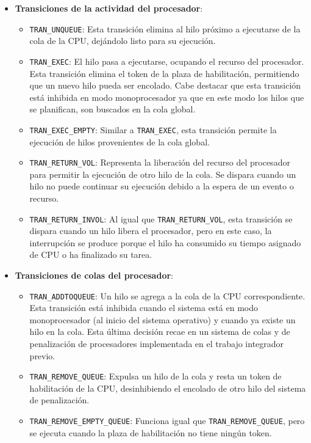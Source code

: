 \begin{itemize}
    \item \textbf{Transiciones de la actividad del procesador}:
        \begin{itemize}
            \item \verb|TRAN_UNQUEUE|: Esta transición elimina al hilo próximo a ejecutarse de la cola de la CPU, dejándolo listo para su ejecución.
            \item \verb|TRAN_EXEC|: El hilo pasa a ejecutarse, ocupando el recurso del procesador. Esta transición elimina el token de la plaza de habilitación, permitiendo que un nuevo hilo pueda ser encolado. Cabe destacar que esta transición está inhibida en modo monoprocesador ya que en este modo los hilos que se planifican, son buscados en la cola global.
            \item \verb|TRAN_EXEC_EMPTY|: Similar a \verb|TRAN_EXEC|, esta transición permite la ejecución de hilos provenientes de la cola global.
            \item \verb|TRAN_RETURN_VOL|: Representa la liberación del recurso del procesador para permitir la ejecución de otro hilo de la cola. Se dispara cuando un hilo no puede continuar su ejecución debido a la espera de un evento o recurso.
            \item \verb|TRAN_RETURN_INVOL|: Al igual que \verb|TRAN_RETURN_VOL|, esta transición se dispara cuando un hilo libera el procesador, pero en este caso, la interrupción se produce porque el hilo ha consumido su tiempo asignado de CPU o ha finalizado su tarea.
        \end{itemize}
    \item \textbf{Transiciones de colas del procesador}:
        \begin{itemize}
            \item \verb|TRAN_ADDTOQUEUE|: Un hilo se agrega a la cola de la CPU correspondiente. Esta transición está inhibida cuando el sistema está en modo monoprocesador (al inicio del sistema operativo) y cuando ya existe un hilo en la cola. Esta última decisión recae en un sistema de colas y de penalización de procesadores implementada en el trabajo integrador previo.
            \item \verb|TRAN_REMOVE_QUEUE|: Expulsa un hilo de la cola y resta un token de habilitación de la CPU, desinhibiendo el encolado de otro hilo del sistema de penalización.
            \item \verb|TRAN_REMOVE_EMPTY_QUEUE|: Funciona igual que \verb|TRAN_REMOVE_QUEUE|, pero se ejecuta cuando la plaza de habilitación no tiene ningún token.

\end{itemize}
\end{itemize}
